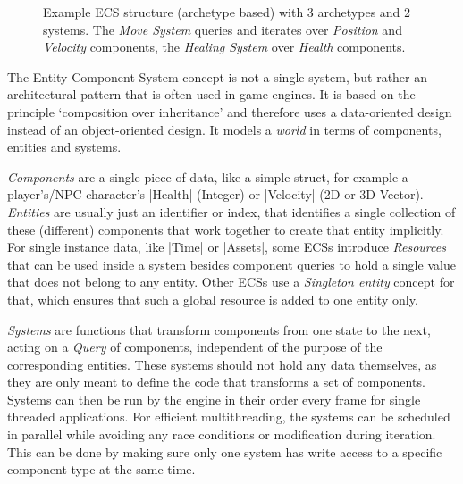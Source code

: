 \begin{figure}[h!]
\caption{Example ECS structure (archetype based) with 3 archetypes and 2 systems. The \textit{Move System} queries and iterates over \textit{Position} and \textit{Velocity} components, the \textit{Healing System} over \textit{Health} components.}
\label{fig:ecs}
\end{figure}

The Entity Component System concept is not a single system, but rather an architectural pattern that is often used in game engines. It is based on the principle `composition over inheritance' and therefore uses a data-oriented design instead of an object-oriented design. It models a \textit{world} in terms of components, entities and systems.

\textit{Components} are a single piece of data, like a simple struct, for example a player's/NPC character's |Health| (Integer) or |Velocity| (2D or 3D Vector). \textit{Entities} are usually just an identifier or index, that identifies a single collection of these (different) components that work together to create that entity implicitly. For single instance data, like |Time| or |Assets|, some ECSs introduce \textit{Resources} that can be used inside a system besides component queries to hold a single value that does not belong to any entity. Other ECSs use a \textit{Singleton entity} concept for that, which ensures that such a global resource is added to one entity only.

\textit{Systems} are functions that transform components from one state to the next, acting on a \textit{Query} of components, independent of the purpose of the corresponding entities. These systems should not hold any data themselves, as they are only meant to define the code that transforms a set of components. Systems can then be run by the engine in their order every frame for single threaded applications. For efficient multithreading, the systems can be scheduled in parallel while avoiding any race conditions or modification during iteration. This can be done by making sure only one system has write access to a specific component type at the same time.

